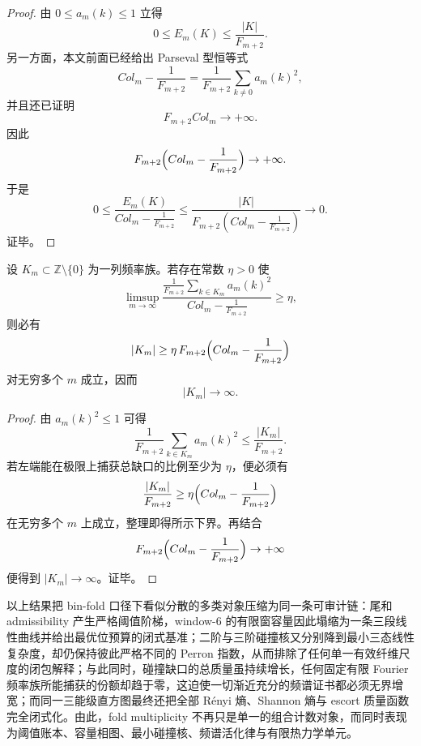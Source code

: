 \begin{proof}
由 \(0\le a_m(k)\le 1\) 立得
\[
0\le E_m(K)\le \frac{|K|}{F_{m+2}}.
\]
另一方面，本文前面已经给出 Parseval 型恒等式
\[
Col_m-\frac1{F_{m+2}}
=
\frac1{F_{m+2}}\sum_{k\ne 0}a_m(k)^2,
\]
并且还已证明
\[
F_{m+2}Col_m\to+\infty.
\]
因此
\[
F_{m+2}\Bigl(Col_m-\frac1{F_{m+2}}\Bigr)\to+\infty.
\]
于是
\[
0\le
\frac{E_m(K)}{Col_m-\frac1{F_{m+2}}}
\le
\frac{|K|}{F_{m+2}\left(Col_m-\frac1{F_{m+2}}\right)}
\longrightarrow 0.
\]
证毕。
\end{proof}

\begin{corollary}[任何渐近充分的频谱证书都必须无界增宽]\label{cor:conclusion-foldbin-sufficient-spectral-certificate-must-widen}
设 \(K_m\subset \mathbb Z\setminus\{0\}\) 为一列频率族。若存在常数 \(\eta>0\) 使
\[
\limsup_{m\to\infty}
\frac{\frac1{F_{m+2}}\sum_{k\in K_m}a_m(k)^2}
{Col_m-\frac1{F_{m+2}}}
\ge \eta,
\]
则必有
\[
|K_m|
\ge
\eta\,F_{m+2}\Bigl(Col_m-\frac1{F_{m+2}}\Bigr)
\]
对无穷多个 \(m\) 成立，因而
\[
|K_m|\to\infty.
\]
\end{corollary}

\begin{proof}
由 \(a_m(k)^2\le 1\) 可得
\[
\frac1{F_{m+2}}\sum_{k\in K_m}a_m(k)^2
\le \frac{|K_m|}{F_{m+2}}.
\]
若左端能在极限上捕获总缺口的比例至少为 \(\eta\)，便必须有
\[
\frac{|K_m|}{F_{m+2}}
\ge
\eta\Bigl(Col_m-\frac1{F_{m+2}}\Bigr)
\]
在无穷多个 \(m\) 上成立，整理即得所示下界。再结合
\[
F_{m+2}\Bigl(Col_m-\frac1{F_{m+2}}\Bigr)\to+\infty
\]
便得到 \(|K_m|\to\infty\)。证毕。
\end{proof}



\noindent
以上结果把 bin-fold 口径下看似分散的多类对象压缩为同一条可审计链：尾和 admissibility 产生严格阈值阶梯，window-\(6\) 的有限窗容量因此塌缩为一条三段线性曲线并给出最优位预算的闭式基准；二阶与三阶碰撞核又分别降到最小三态线性复杂度，却仍保持彼此严格不同的 Perron 指数，从而排除了任何单一有效纤维尺度的闭包解释；与此同时，碰撞缺口的总质量虽持续增长，任何固定有限 Fourier 频率族所能捕获的份额却趋于零，这迫使一切渐近充分的频谱证书都必须无界增宽；而同一三能级直方图最终还把全部 R\'enyi 熵、Shannon 熵与 escort 质量函数完全闭式化。由此，fold multiplicity 不再只是单一的组合计数对象，而同时表现为阈值账本、容量相图、最小碰撞核、频谱活化律与有限热力学单元。

\endinput
